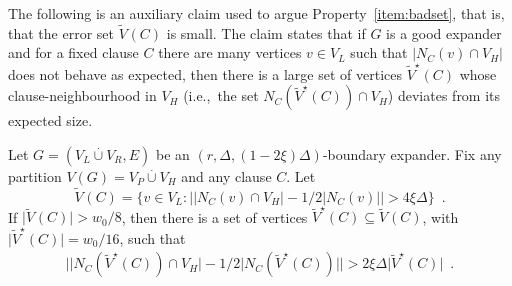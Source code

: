\documentclass{theoretics}
\providecommand{\abs}[1]{\lvert#1\rvert}
\providecommand{\Abs}[1]{\bigl\lvert#1\bigr\rvert}
\newcommand{\set}[1]{\{ #1 \}}
\newcommand{\setsize}[1]{\lvert#1\rvert}
\newcommand{\disjointunion}{\overset{.}{\cup}}
\newcommand{\eqperiod}{\enspace .}
\newcommand{\ie}{i.e.,\ }
\newcommand{\neigh}[2][]{N_{{#1}}(#2)}
\newcommand{\diff}{\xi}
\newcommand{\GdegMax}{\Delta}
\newcommand{\V}[1][]{V_{#1}}
\newcommand{\Vl}{\V[L]}
\newcommand{\Vr}{\V[R]}
\newcommand{\Vp}{\V[P]}
\newcommand{\Vh}{\V[H]}
\newcommand{\Vbad}[2][]{\widetilde V^{#1}(#2)}
\numberwithin{equation}{section}
\begin{document}
The following is an auxiliary claim used to argue
Property~\ref{item:badset}, that is, that the error set $\Vbad{C}$ is
small. The claim states that if $G$ is a good expander and for a fixed
clause $C$ there are many vertices $v \in \Vl$ such that
$\setsize{\neigh[C]{v} \cap \Vh}$ does not behave as expected, then
there is a large set of vertices $\Vbad[\star]{C}$ whose
clause-neighbourhood in $\Vh$ (\ie the set
$\neigh[C]{\Vbad[\star]{C}} \cap \Vh$) deviates from its expected
size.

\begin{claim}\label{cl:non_expansion}
  Let $G=( \Vl \disjointunion \Vr, E)$ be an 
  $(r, \GdegMax, \left(1 - 2\diff \right)\GdegMax)$-boundary 
  expander.
  Fix any partition $V(G) = \Vp \disjointunion \Vh$ and any clause $C$.
  Let
  \begin{equation*}
    \Vbad{C} = \set{v \in \Vl :
      \Abs{ \abs{ \neigh[C]{v} \cap \Vh } - 
        1/2\abs{ \neigh[C]{v} } } > 
      4 \diff \GdegMax} \eqperiod
  \end{equation*}
  If $\setsize{ \Vbad{C} } > w_0/8$, then there is a set
  of vertices $\Vbad[\star]{C} \subseteq \Vbad{C}$, with 
  $\setsize{ \Vbad[\star]{C} } = w_0/16$, such that
  \begin{align*}
    \Abs{ \abs{ \neigh[C]{\Vbad[\star]{C} } \cap \Vh } -
    1/2\abs{ \neigh[C]{ \Vbad[\star]{C} } }} >
    2 \diff \GdegMax \setsize{ \Vbad[\star]{C} } \eqperiod
  \end{align*}
\end{claim}
\end{document}
